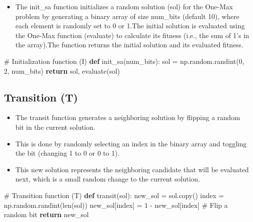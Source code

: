 \documentclass[
  letterpaper,
  DIV=11,
  numbers=noendperiod]{scrreprt}
\newenvironment{Shaded}{\begin{snugshade}}{\end{snugshade}}
\newcommand{\BuiltInTok}[1]{\textcolor[rgb]{0.00,0.23,0.31}{#1}}
\newcommand{\CommentTok}[1]{\textcolor[rgb]{0.37,0.37,0.37}{#1}}
\newcommand{\ControlFlowTok}[1]{\textcolor[rgb]{0.00,0.23,0.31}{\textbf{#1}}}
\newcommand{\DecValTok}[1]{\textcolor[rgb]{0.68,0.00,0.00}{#1}}
\newcommand{\KeywordTok}[1]{\textcolor[rgb]{0.00,0.23,0.31}{\textbf{#1}}}
\newcommand{\NormalTok}[1]{\textcolor[rgb]{0.00,0.23,0.31}{#1}}
\newcommand{\OperatorTok}[1]{\textcolor[rgb]{0.37,0.37,0.37}{#1}}
\providecommand{\tightlist}{%
  \setlength{\itemsep}{0pt}\setlength{\parskip}{0pt}}\usepackage{longtable,booktabs,array}
\begin{document}
\begin{itemize}
\tightlist
\item
  The init\_sa function initializes a random solution (sol) for the
  One-Max problem by generating a binary array of size num\_bits
  (default 10), where each element is randomly set to 0 or 1.The initial
  solution is evaluated using the One-Max function (evaluate) to
  calculate its fitness (i.e., the sum of 1's in the array).The function
  returns the initial solution and its evaluated fitness.
\end{itemize}

\begin{Shaded}
\begin{Highlighting}[]
\CommentTok{\# Initialization function (I)}
\KeywordTok{def}\NormalTok{ init\_sa(num\_bits):}
\NormalTok{    sol }\OperatorTok{=}\NormalTok{ np.random.randint(}\DecValTok{0}\NormalTok{, }\DecValTok{2}\NormalTok{, num\_bits)}
    \ControlFlowTok{return}\NormalTok{ sol, evaluate(sol)}
\end{Highlighting}
\end{Shaded}

\subsection{Transition (T)}\label{transition-t}

\begin{itemize}
\tightlist
\item
  The transit function generates a neighboring solution by flipping a
  random bit in the current solution.
\item
  This is done by randomly selecting an index in the binary array and
  toggling the bit (changing 1 to 0 or 0 to 1).
\item
  This new solution represents the neighboring candidate that will be
  evaluated next, which is a small random change to the current
  solution.
\end{itemize}

\begin{Shaded}
\begin{Highlighting}[]
\CommentTok{\# Transition function (T)}
\KeywordTok{def}\NormalTok{ transit(sol):}
\NormalTok{    new\_sol }\OperatorTok{=}\NormalTok{ sol.copy()}
\NormalTok{    index }\OperatorTok{=}\NormalTok{ np.random.randint(}\BuiltInTok{len}\NormalTok{(sol))}
\NormalTok{    new\_sol[index] }\OperatorTok{=} \DecValTok{1} \OperatorTok{{-}}\NormalTok{ new\_sol[index]  }\CommentTok{\# Flip a random bit}
    \ControlFlowTok{return}\NormalTok{ new\_sol}
\end{Highlighting}
\end{Shaded}
\end{document}

